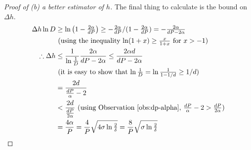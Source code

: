 \begin{proof}[Proof of (b) a better estimator of $h$]
    The final thing to calculate is the bound on $\Delta h$.
    \begin{align*}
	\Delta h \ln D & \ge \ln\left( 1 - \tfrac{2\alpha}{dP} \right)
			 \ge -\tfrac{2\alpha}{dP}/(1-\tfrac{2\alpha}{dP}) =
	-\tfrac{2\alpha}{dP-2\alpha}\\
	& \mbox{ (using the inequality $\ln(1+x) \ge
	\tfrac{x}{1+x}$ for $x > -1$)} \\
	\therefore \Delta h & \le \frac{1}{\ln\tfrac{1}{D}} \frac{2\alpha}{dP -
	2\alpha} \le \frac{2\alpha d}{dP - 2\alpha}\\
	& \mbox{ (it is easy to show that $\ln \tfrac{1}{D} =
	\ln\tfrac{1}{1-1/d} \ge 1/d$)}\\
	& = \frac{2d}{\tfrac{dP}{\alpha} - 2} \\
	& < \frac{2d}{\tfrac{dP}{2\alpha}} 
	\mbox{ (using Observation~\ref{obs:dp-alpha}, $\tfrac{dP}{\alpha}-2 >\tfrac{dP}{2\alpha}$)}\\
	& = \frac{4\alpha}{P} = \frac{4}{P}\sqrt{4\sigma \ln \tfrac{2}{\delta}} =
	\frac{8}{P}\sqrt{\sigma \ln \tfrac{2}{\delta}}
    \end{align*}
\end{proof}

